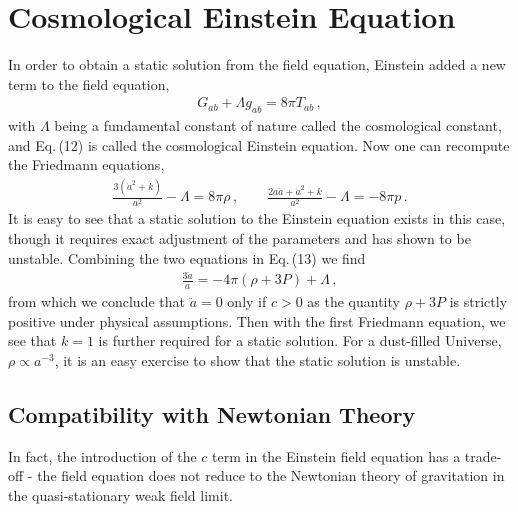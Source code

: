 \documentclass[11pt]{article}
\theoremstyle{break}
\theoremstyle{break}
\begin{document}
\section{Cosmological Einstein Equation}
In order to obtain a static solution from the field equation, Einstein added a new term to the field equation, 
\begin{align}
G_{ab} + \Lambda g_{ab} = 8\pi T_{ab}\,,
\end{align}
with $\Lambda$ being a fundamental constant of nature called the cosmological constant, and Eq.\,(12) is called the cosmological Einstein equation. Now one can recompute the Friedmann equations,
\begin{align}
\frac{3(\dot{a}^2 + k)}{a^2} - \Lambda = 8\pi \rho \,,\qquad 
\frac{2a\ddot{a} + \dot{a}^2 + k}{a^2} - \Lambda = -8\pi p\,.
\end{align}
It is easy to see that a static solution to the Einstein equation exists in this case, though it requires exact adjustment of the parameters and has shown to be unstable. Combining the two equations in Eq.\,(13) we find
\begin{align*}
\frac{3\ddot{a}}{a} = -4\pi (\rho +3P) +\Lambda\,,
\end{align*}
from which we conclude that $\ddot{a} = 0$ only if $c >0$ as the quantity $\rho+3P$ is strictly positive under physical assumptions. Then with the first Friedmann equation, we see that $k= 1$ is further required for a static solution. For a dust-filled Universe, $\rho\propto a^{-3}$, it is an easy exercise to show that the static solution is unstable.\\

\subsection{Compatibility with Newtonian Theory}
In fact, the introduction of the $c$ term in the Einstein field equation has a trade-off - the field equation does not reduce to the Newtonian theory of gravitation in the quasi-stationary weak field limit. \\
\end{document}
